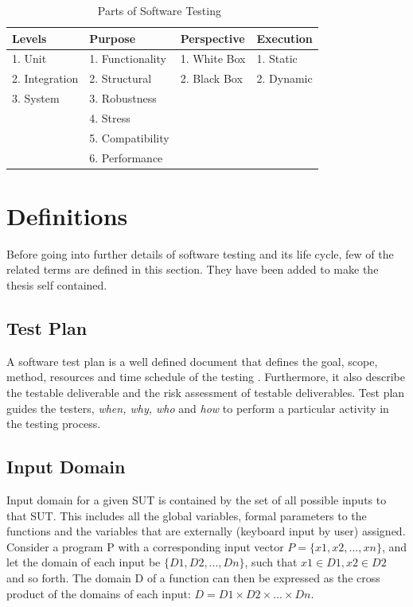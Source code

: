 \begin{table}[ht]
\caption{Parts of Software Testing~\cite{adrion1982validation, chilenski1994applicability, gaudel2010software, richardson1992specification, tracey1998automated}} %
\smallskip
\centering %
\begin{tabular}{| l | l | l | l | } %
\hline

Levels 					&Purpose		 		& Perspective			& Execution 	\\
\hline
1. Unit					&1. Functionality			& 1. White Box			& 1. Static 	\\
2. Integration			&2. Structural			& 2. Black Box			& 2. Dynamic\\
3. System				&3. Robustness			& 						&			\\
						&4. Stress				&						&			\\
						&5. Compatibility			&						&			\\
						&6. Performance			&						&			\\



\hline %
\end{tabular}
\bigskip
\label{table:softwareTestingParts} %
\end{table}

\section{Definitions}
Before going into further details of software testing and its life cycle, few of the related terms are defined in this section. They have been added to make the thesis self contained.

\subsection{Test Plan}
A software test plan is a well defined document that defines the goal, scope, method, resources and time schedule of the testing \cite{futrell2001quality}. Furthermore, it also describe the testable deliverable and the risk assessment of testable deliverables. Test plan guides the testers, {\it {when, why, who}} and {\it {how}} to perform a particular activity in the testing process. 

\subsection{Input Domain} 
Input domain for a given SUT is contained by the set of all possible inputs to that SUT. This includes all the global variables, formal parameters to the functions and the variables that are externally (keyboard input by user) assigned. Consider a program P with a corresponding input vector $ P =\{x1, x2, . . . , xn\}$, and let the domain of each input be $\{D1, D2, . . . , Dn\}$, such that $x1 \in D1,x2 \in D2$ and so forth. The domain D of a function can then be expressed as the cross product of the domains of each input: $D = D1 \times D2 \times . . . \times Dn$.

